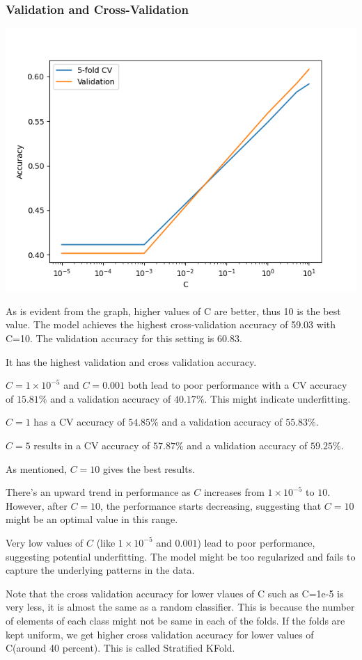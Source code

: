 \documentclass[12pt,a4paper]{article}
\begin{document}
\subsubsection{Validation and Cross-Validation}
\includegraphics[width=\textwidth]{Assignment 2/q2/cross_validation_mult real.png}

As is evident from the graph, higher values of C are better, thus 10 is the best value. 
The model achieves the highest cross-validation accuracy of 59.03 with C=10. The validation accuracy for this setting is 60.83.

It has the highest validation and cross validation accuracy. 

\( C = 1 \times 10^{-5} \) and \( C = 0.001 \) both lead to poor performance with a CV accuracy of \( 15.81\% \) and a validation accuracy of \( 40.17\% \). This might indicate underfitting.

\( C = 1 \) has a CV accuracy of \( 54.85\% \) and a validation accuracy of \( 55.83\% \).

\( C = 5 \) results in a CV accuracy of \( 57.87\% \) and a validation accuracy of \( 59.25\% \).

As mentioned, \( C = 10 \) gives the best results.

There's an upward trend in performance as \( C \) increases from \( 1 \times 10^{-5} \) to \( 10 \). However, after \( C = 10 \), the performance starts decreasing, suggesting that \( C = 10 \) might be an optimal value in this range.

Very low values of \( C \) (like \( 1 \times 10^{-5} \) and \( 0.001 \)) lead to poor performance, suggesting potential underfitting. The model might be too regularized and fails to capture the underlying patterns in the data.


Note that the cross validation accuracy for lower vlaues of C such as C=1e-5 is very less, it is almost the same as a random classifier. This is because the number of elements of each class might not be same in each of the folds. If the folds are kept uniform, we get higher cross validation accuracy for lower values of C(around 40 percent). This is called Stratified KFold.
\end{document}

